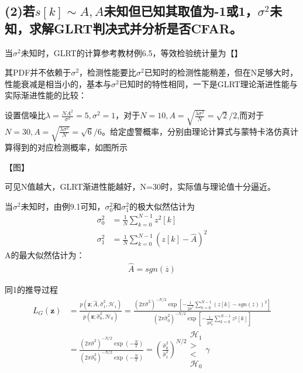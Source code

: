 \documentclass[fontset=windows]{article}
\numberwithin{figure}{section}
\begin{document}
\subsection*{(2)若\(s[k]\sim A,A\)未知但已知其取值为-1或1，\(\sigma^2\)未知，求解GLRT判决式并分析是否CFAR。}

当\(\sigma^2\)未知时，GLRT的计算参考教材例6.5，等效检验统计量为【】

其PDF并不依赖于\(\sigma^2\)，检测性能要比\(\sigma^2\)已知时的检测性能稍差，但在N足够大时，性能衰减是相当小的，基本与\(\sigma^2\)已知时的特性相同，一下是GLRT理论渐进性能与实际渐进性能的比较：

设置信噪比\(\lambda=\frac{NA^2}{\sigma^2}=5,\sigma^2=1\)，对于\(N=10,A=\sqrt{\frac{\lambda\sigma^2}{N}}=\sqrt{2}/2\),而对于\(N=30,A=\sqrt{\frac{\lambda\sigma^2}{N}}=\sqrt{6}/6\)。给定虚警概率，分别由理论计算式与蒙特卡洛仿真计算得到的对应检测概率，如图所示

【图】

可见N值越大，GLRT渐进性能越好，N=30时，实际值与理论值十分逼近。

当\(\sigma^2\)未知时，由例9.1可知，\(\sigma^2_0\)和\(\sigma^2_1\)的极大似然估计为
\begin{align*}
    \sigma^2_0 & =\frac{1}{N}\sum_{k=0}^{N-1}z^2[k]           \\
    \sigma^2_1 & =\frac{1}{N}\sum_{k=0}^{N-1}(z[k]-\hat{A})^2
\end{align*}
A的最大似然估计为：
\begin{align*}
    \hat{A}=sgn(\overline{z})
\end{align*}

同1的推导过程
\begin{align*}
    L_G(\mathbf{z})
     & =\frac{p(\mathbf{z};\hat{A},\hat{\sigma}^2_1,\mathcal{H}_1)}{p(\mathbf{z};\hat{\sigma}^2_0,\mathcal{H}_0)}
    =\frac{(2\pi \hat{\sigma}^2)^{-N/2}\exp\left[-\frac{1}{2\hat{\sigma}^2}\sum_{k=0}^{N-1}(z[k]-sgn(\overline{z}))^2\right]}
    {(2\pi \hat{\sigma}_0^2)^{-N/2}\exp\left[-\frac{1}{2\hat{\sigma}_0^2}\sum_{k=0}^{N-1}z^2[k]\right]}           \\
     & =\frac{(2\pi \hat{\sigma}^2)^{-N/2}\exp\left(-\frac{N}{2}\right)}
    {(2\pi \hat{\sigma}_0^2)^{-N/2}\exp\left(-\frac{N}{2}\right)}=\left(\frac{\hat{\sigma}_0^2}{\hat{\sigma}_1^2}\right)^{N/2}
    \begin{matrix}
        \mathcal{H}_1 \\>\\<\\\mathcal{H_0}
    \end{matrix}\gamma
\end{align*}
\end{document}
